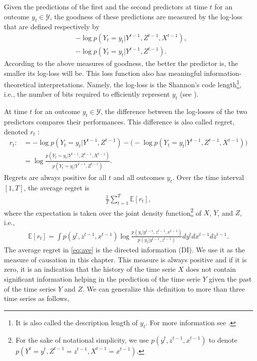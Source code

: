 Given the predictions of the first and the second predictors at time $t$ for an outcome $y_t\in \mathcal{Y}$, the goodness of these predictions are measured by the log-loss that are defined respectively by 
\begin{align*}
    &-\log p(Y_t=y_t|Y^{t-1},Z^{t-1},X^{t-1}),\\
    &-\log p(Y_t=y_t|Y^{t-1},Z^{t-1}).
\end{align*}
According to the above measures of goodness, the better the predictor is, the smaller its log-loss will be.
This loss function also has meaningful information-theoretical interpretations.
Namely, the log-loss is the Shannon's code length\footnote{It is also called the description length of $y_t$. For more information see \citet{cover2012elements}.}, i.e., the number of bits required to efficiently represent $y_t$ (see \citet{etesami2018econometric}). 

At time $t$ for an outcome $y_t\in \mathcal{Y}$, the difference between the log-losses of the two predictors compares their performances.  This difference is also called regret, denoted $r_t$ :
\begin{align}
r_t:&=-\log{p(Y_t=y_t|Y^{t-1},Z^{t-1})}-\big(-\log {p(Y_t=y_t|Y^{t-1},Z^{t-1},X^{t-1})}\big) \nonumber \\
&=\log \frac{p(Y_t=y_t|Y^{t-1},Z^{t-1},X^{t-1})}{p(Y_t=y_t|Y^{t-1},Z^{t-1})}.
\end{align}
Regrets are always positive for all $t$ and all outcomes $y_t$.
Over the time interval $[1,T]$, the average regret is
\begin{align}\label{eq:ave}
   \frac{1}{T}\sum_{t=1}^T \mathbb{E}[r_t],
\end{align}
where the expectation is taken over the joint density function\footnote{For the sake of notational simplicity, we use $p(y^{t},z^{t-1},x^{t-1})$ to denote $p(Y^{t}=y^{t},Z^{t-1}=z^{t-1},X^{t-1}=x^{t-1})$.} of $X$, $Y$, and $Z$, i.e., 
\begin{align}
    \mathbb{E}[r_t]=\int p(y^{t},z^{t-1},x^{t-1})\log \frac{p(y_t|y^{t-1},z^{t-1},x^{t-1})}{p(y_t|y^{t-1},z^{t-1})}dy^tdx^{t-1}dz^{t-1}.
\end{align}
The average regret in \eqref{eq:ave} is the directed information (DI). We use it as the measure of causation in this chapter.
This measure is always positive and if it is zero, it is an indication that the history of the time serie $X$ does not contain significant information helping in the prediction of the time serie $Y$ given the past of the time series $Y$ and $Z$. 
We can generalize this definition to more than three time series as follows,

